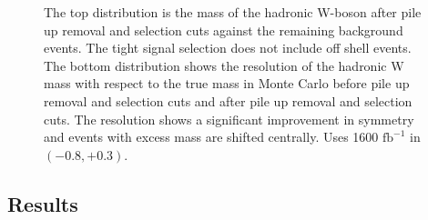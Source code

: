\begin{figure}

\centering
       \centering
   
   
        \centering
     \caption{The top distribution is the mass of the hadronic W-boson after pile up removal and selection cuts against the remaining background events. The tight signal selection does not include off shell events. The bottom distribution shows the resolution of the hadronic W mass with respect to the true mass in Monte Carlo before pile up removal and selection cuts and after pile up removal and selection cuts. The resolution shows a significant improvement in symmetry and events with excess mass are shifted centrally.  Uses 1600 $\text{fb}^{-1}$ in $(-0.8,+0.3)$. 
}
\label{fig:money}
\end{figure}

\subsection{Results}
\label{subsec:wmass}

